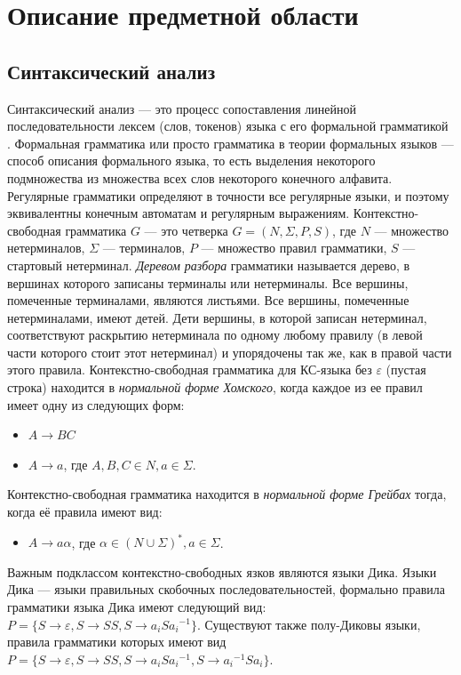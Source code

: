 \documentclass{spbau-diploma}
\begin{document}
\section{Описание предметной области}
\subsection{Синтаксический анализ}
Синтаксический анализ --- это процесс сопоставления линейной последовательности лексем (слов, токенов) языка с его формальной грамматикой \cite{UlmanCompilers}.  Формальная грамматика или просто грамматика в теории формальных языков --- способ описания формального языка, то есть выделения некоторого подмножества из множества всех слов некоторого конечного алфавита.  Регулярные грамматики определяют в точности все регулярные языки, и поэтому эквивалентны конечным автоматам и регулярным выражениям. Контекстно-свободная грамматика $G$ --- это четверка $G = (N, \Sigma, P, S)$, где $N$ --- множество нетерминалов, $\Sigma$ --- терминалов, $P$ --- множество правил грамматики, $S$ --- стартовый нетерминал. \textit{Деревом разбора} грамматики называется дерево, в вершинах которого записаны терминалы или нетерминалы. Все вершины, помеченные терминалами, являются листьями. Все вершины, помеченные нетерминалами, имеют детей. Дети вершины, в которой записан нетерминал, соответствуют раскрытию нетерминала по одному любому правилу (в левой части которого стоит этот нетерминал) и упорядочены так же, как в правой части этого правила. Контекстно-свободная грамматика для КС-языка без $\varepsilon$ (пустая строка)  \cite{Hopcroft} находится в \textit{нормальной форме Хомского}, когда каждое из ее правил имеет одну из следующих форм:
\begin{itemize}
\item $A \rightarrow BC$
\item $A \rightarrow a$, где $A, B, C \in N, a \in \Sigma$.
\end{itemize}
Контекстно-свободная грамматика находится в \textit{нормальной форме Грейбах} тогда, когда её правила имеют вид:
\begin{itemize}
\item $A \rightarrow a\alpha$, где $\alpha \in {(N \cup \Sigma)}^*, a \in \Sigma$.
\end{itemize}
Важным подклассом контекстно-свободных язков являются языки Дика. Языки Дика --- языки правильных скобочных последовательностей, формально правила грамматики языка Дика имеют следующий вид: $P = \{S \rightarrow \varepsilon, S \rightarrow SS, S \rightarrow a_i S {a_i}^{-1}\}$. Существуют также полу-Диковы языки, правила грамматики которых имеют вид $P = \{S \rightarrow \varepsilon, S \rightarrow SS, S \rightarrow a_i S {a_i}^{-1}, S \rightarrow {a_i}^{-1} S {a_i}\}$.\par
\end{document}
